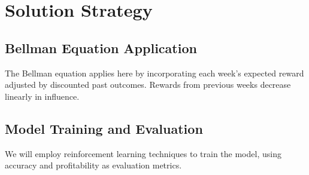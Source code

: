 \section{Solution Strategy}
    \subsection{Bellman Equation Application}
    The Bellman equation applies here by incorporating each week’s expected reward adjusted by discounted past outcomes. Rewards from previous weeks decrease linearly in influence.

    \subsection{Model Training and Evaluation}
    We will employ reinforcement learning techniques to train the model, using accuracy and profitability as evaluation metrics.